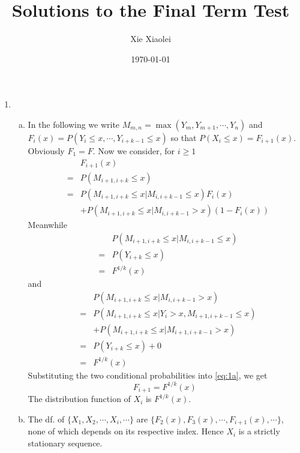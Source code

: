 \documentclass{report}
\author{Xie Xiaolei}
\date{\today}
\title{Solutions to the Final Term Test}
\begin{document}
\maketitle

\begin{enumerate}[1.]
\item
  \begin{enumerate}[(a)]
  \item In the following we write $M_{m, n}=\max(Y_m, Y_{m+1}, \cdots,
    Y_n)$ and $F_i(x) = P(Y_i \le x, \cdots, Y_{i+k-1} \le x)$ so that
    $P(X_i \le x) = F_{i+1}(x)$. Obviously $F_1 = F$. Now we consider,
    for $i \ge 1$
    \begin{eqnarray}
      && F_{i+1}(x) \nonumber \\
      &=& P(M_{i+1, i+k} \le x) \nonumber \\
      &=& P(M_{i+1, i+k} \le x | M_{i, i+k-1} \le x) F_i(x)
      \nonumber \\
      && +P(M_{i+1, i+k} \le x | M_{i, i+k-1} > x) (1- F_i(x)) \label{eq:1a}
    \end{eqnarray}
    Meanwhile
    \begin{eqnarray*}
      && P(M_{i+1, i+k} \le x | M_{i, i+k-1} \le x) \\
      &=& P(Y_{i+k} \le x) \\
      &=& F^{1/k}(x)
    \end{eqnarray*}
    and
    \begin{eqnarray*}
      && P(M_{i+1, i+k} \le x | M_{i, i+k-1} > x) \\
      &=& P(M_{i+1, i+k} \le x | Y_i > x, M_{i+1, i+k-1} \le x) \\
      && +P(M_{i+1, i+k} \le x | M_{i+1, i+k-1} > x) \\
      &=& P(Y_{i+k} \le x) + 0 \\
      &=& F^{1/k}(x)
    \end{eqnarray*}
    Substituting the two conditional probabilities into \eqref{eq:1a},
    we get
    \[
    F_{i+1} = F^{1/k}(x)
    \]
    The distribution function of $X_i$ is $F^{1/k}(x)$.

  \item The df. of $\{X_1, X_2, \cdots, X_i, \cdots\}$ are $\{F_2(x), F_3(x),
    \cdots, F_{i+1}(x), \cdots\}$, none of which depends on its
    respective index. Hence $X_i$ is a strictly stationary sequence.


\end{enumerate}
\end{enumerate}
\end{document}
